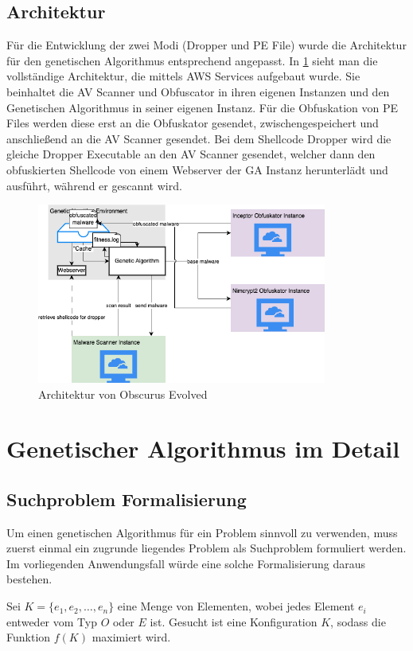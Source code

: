 \subsection{Architektur}
Für die Entwicklung der zwei Modi (Dropper und PE File) wurde die Architektur für den genetischen Algorithmus entsprechend angepasst. In \ref{fig:architecture} sieht man die vollständige Architektur, die mittels AWS Services aufgebaut wurde. Sie beinhaltet die AV Scanner und Obfuscator in ihren eigenen Instanzen und den Genetischen Algorithmus in seiner eigenen Instanz. Für die Obfuskation von PE Files werden diese erst an die Obfuskator gesendet, zwischengespeichert und anschließend an die AV Scanner gesendet. Bei dem Shellcode Dropper wird die gleiche Dropper Executable an den AV Scanner gesendet, welcher dann den obfuskierten Shellcode von einem Webserver der GA Instanz herunterlädt und ausführt, während er gescannt wird.
\begin{figure}[h]
    \centering
    \includegraphics[width=0.85\textwidth]{gfx/Abbildungen/Architektur.drawio.png}
    \caption{Architektur von Obscurus Evolved}
    \label{fig:architecture}
\end{figure}\section{Genetischer Algorithmus im Detail}
    \subsection{Suchproblem Formalisierung}
    Um einen genetischen Algorithmus für ein Problem sinnvoll zu verwenden, muss zuerst einmal ein zugrunde liegendes Problem als Suchproblem formuliert werden. Im vorliegenden Anwendungsfall würde eine solche Formalisierung daraus bestehen.


Sei $K = \{e_1, e_2, \ldots, e_n\}$ eine Menge von Elementen, wobei jedes Element $e_i$ entweder vom Typ $O$ oder $E$ ist. Gesucht ist eine Konfiguration $K$, sodass die Funktion $f(K)$ maximiert wird.


